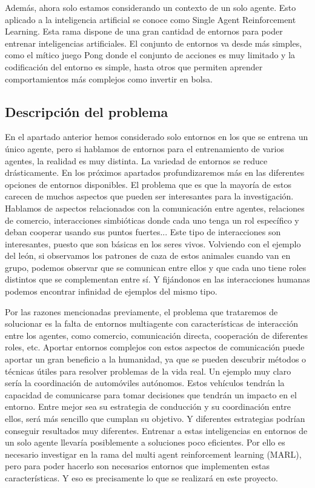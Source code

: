 Además, ahora solo estamos considerando un contexto de un solo agente. Esto aplicado a la inteligencia artificial se conoce como Single Agent Reinforcement Learning. Esta rama dispone de una gran cantidad de entornos para poder entrenar inteligencias artificiales. El conjunto de entornos va desde más simples, como el mítico juego Pong donde el conjunto de acciones es muy limitado y la codificación del entorno es simple, hasta otros que permiten aprender comportamientos más complejos como invertir en bolsa.

\subsection{Descripción del problema}

En el apartado anterior hemos considerado solo entornos en los que se entrena un único agente, pero si hablamos de entornos para el entrenamiento de varios agentes, la realidad es muy distinta. La variedad de entornos se reduce drásticamente. En los próximos apartados profundizaremos más en las diferentes opciones de entornos disponibles. El problema que es que la mayoría de estos carecen de muchos aspectos que pueden ser interesantes para la investigación. Hablamos de aspectos relacionados con la comunicación entre agentes, relaciones de comercio, interacciones simbióticas donde cada uno tenga un rol específico y deban cooperar usando sus puntos fuertes... Este tipo de interacciones son interesantes, puesto que son básicas en los seres vivos. Volviendo con el ejemplo del león, si observamos los patrones de caza de estos animales cuando van en grupo, podemos observar que se comunican entre ellos y que cada uno tiene roles distintos que se complementan entre sí. Y fijándonos en las interacciones humanas podemos encontrar infinidad de ejemplos del mismo tipo.  

Por las razones mencionadas previamente, el problema que trataremos de solucionar es la falta de entornos multiagente con características de interacción entre los agentes, como comercio, comunicación directa, cooperación de diferentes roles, etc. Aportar entornos complejos con estos aspectos de comunicación puede aportar un gran beneficio a la humanidad, ya que se pueden descubrir métodos o técnicas útiles para resolver problemas de la vida real. Un ejemplo muy claro sería la coordinación de automóviles autónomos. Estos vehículos tendrán la capacidad de comunicarse para tomar decisiones que tendrán un impacto en el entorno. Entre mejor sea su estrategia de conducción y su coordinación entre ellos, será más sencillo que cumplan su objetivo. Y diferentes estrategias podrían conseguir resultados muy diferentes. Entrenar a estas inteligencias en entornos de un solo agente llevaría posiblemente a soluciones poco eficientes. Por ello es necesario investigar en la rama del multi agent reinforcement learning (MARL), pero para poder hacerlo son necesarios entornos que implementen estas características. Y eso es precisamente lo que se realizará en este proyecto.

